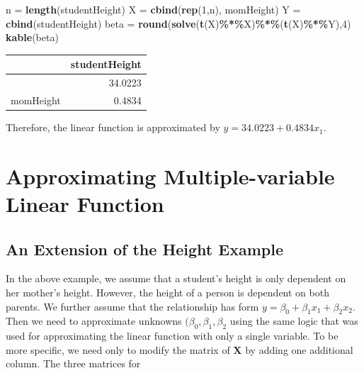 \documentclass[
]{book}
\newenvironment{Shaded}{\begin{snugshade}}{\end{snugshade}}
\newcommand{\DecValTok}[1]{\textcolor[rgb]{0.00,0.00,0.81}{#1}}
\newcommand{\FunctionTok}[1]{\textcolor[rgb]{0.13,0.29,0.53}{\textbf{#1}}}
\newcommand{\NormalTok}[1]{#1}
\newcommand{\OtherTok}[1]{\textcolor[rgb]{0.56,0.35,0.01}{#1}}
\newcommand{\SpecialCharTok}[1]{\textcolor[rgb]{0.81,0.36,0.00}{\textbf{#1}}}
\begin{document}
\begin{Shaded}
\begin{Highlighting}[]
\NormalTok{n }\OtherTok{=} \FunctionTok{length}\NormalTok{(studentHeight)}
\NormalTok{X }\OtherTok{=} \FunctionTok{cbind}\NormalTok{(}\FunctionTok{rep}\NormalTok{(}\DecValTok{1}\NormalTok{,n), momHeight)}
\NormalTok{Y }\OtherTok{=} \FunctionTok{cbind}\NormalTok{(studentHeight)}
\NormalTok{beta }\OtherTok{=} \FunctionTok{round}\NormalTok{(}\FunctionTok{solve}\NormalTok{(}\FunctionTok{t}\NormalTok{(X)}\SpecialCharTok{\%*\%}\NormalTok{X)}\SpecialCharTok{\%*\%}\NormalTok{(}\FunctionTok{t}\NormalTok{(X)}\SpecialCharTok{\%*\%}\NormalTok{Y),}\DecValTok{4}\NormalTok{)}
\FunctionTok{kable}\NormalTok{(beta)}
\end{Highlighting}
\end{Shaded}

\begin{tabular}{l|r}
\hline
  & studentHeight\\
\hline
 & 34.0223\\
\hline
momHeight & 0.4834\\
\hline
\end{tabular}

Therefore, the linear function is approximated by \(y = 34.0223 + 0.4834x_1\).

\hfill\break

\hypertarget{approximating-multiple-variable-linear-function}{%
\section{Approximating Multiple-variable Linear Function}\label{approximating-multiple-variable-linear-function}}

\hypertarget{an-extension-of-the-height-example}{%
\subsection{An Extension of the Height Example}\label{an-extension-of-the-height-example}}

In the above example, we assume that a student's height is only dependent on her mother's height. However, the height of a person is dependent on both parents. We further assume that the relationship has form \(y = \beta_0 + \beta_1 x_1 + \beta_2 x_2\). Then we need to approximate unknowns \((\beta_0, \beta_1, \beta_2\) using the same logic that was used for approximating the linear function with only a single variable. To be more specific, we need only to modify the matrix of \(\mathbf{X}\) by adding one additional column. The three matrices for
\end{document}
